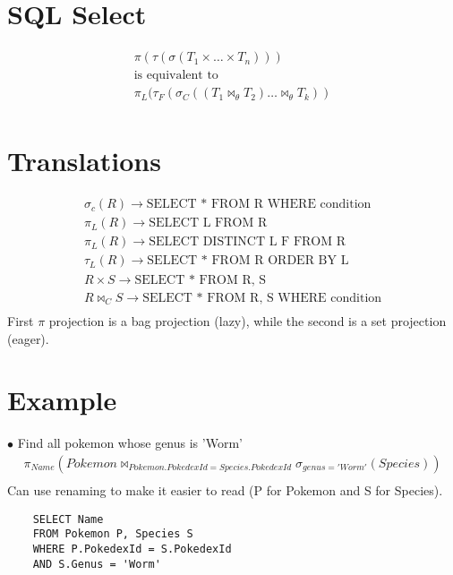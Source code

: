 \documentclass[twoside]{article}
\begin{document}
\newpage
\hfill \break
{}

\section*{SQL Select}
\begin{gather*}
    \pi(\tau(\sigma(T_1 \times \dots \times T_n))) \\
    \text{is equivalent to} \\
    \pi_L(\tau_F(\sigma_C((T_1 \bowtie_\theta T_2)\dots \bowtie_\theta T_k)) \\
\end{gather*}

\section*{Translations}
\begin{gather*}
    \sigma_c(R) \rightarrow \text{SELECT * FROM R WHERE condition} \\
    \pi_L(R) \rightarrow \text{SELECT L FROM R} \\
    \pi_L(R) \rightarrow \text{SELECT DISTINCT L F FROM R} \\
    \tau_L(R) \rightarrow \text{SELECT * FROM R ORDER BY L} \\
    R \times S \rightarrow \text{SELECT * FROM R, S} \\
    R \bowtie_C S \rightarrow \text{SELECT * FROM R, S WHERE condition} \\
\end{gather*}
First $\pi$ projection is a bag projection (lazy), while the second is a set
projection (eager).

\section*{Example}
$\bullet$ Find all pokemon whose genus is 'Worm'
\begin{gather*}
    \pi_{Name}({Pokemon \bowtie_{Pokemon.PokedexId = Species.PokedexId} 
    \sigma_{genus = 'Worm'}({Species})}) \\
\end{gather*}
Can use renaming to make it easier to read (P for Pokemon and S for Species).
\begin{verbatim}
    SELECT Name
    FROM Pokemon P, Species S
    WHERE P.PokedexId = S.PokedexId
    AND S.Genus = 'Worm'
\end{verbatim}
\end{document}
